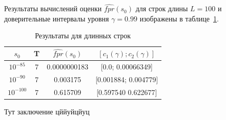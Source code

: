 \documentclass[specialist,
substylefile = spbu_report.rtx,
subf,href,colorlinks=true, 12pt]{disser}
\begin{document}
			 Результаты вычислений оценки $\widehat{fpr}(s_{0})$ для строк длины $L=100$ и доверительные интервалы уровня $\gamma = 0.99$ изображены в таблице~\ref{tb:2}.			 
			 
			 \begin{table}[H]
			 	\centering
			 	\caption{Результаты для длинных строк} \label{tb:2}
			 	\begin{tabular}{cccc}
			 		$s_{0}$&T&$\widehat{fpr}(s_{0})$&$[c_{1}(\gamma);c_{2}(\gamma)]$  \\ \hline
			 		$10^{-85}$&7&0.0000000183&[0.0; 0.00066349] \\
			 		$10^{-90}$&7&0.003175&[0.001884; 0.004779] \\ 
			 		$10^{-100}$&7&0.615709&[0.597540 0.622677] \\
			 	\end{tabular}
			 \end{table}
		
		\conclusion
			Тут заключение	цййуйцйуц	

			\nocite{Stamp2021}
			\nocite{Jurafsky2021}
			\nocite{Rabiner1989}
			\nocite{Newberg2008}
			
			
						
\end{document}
